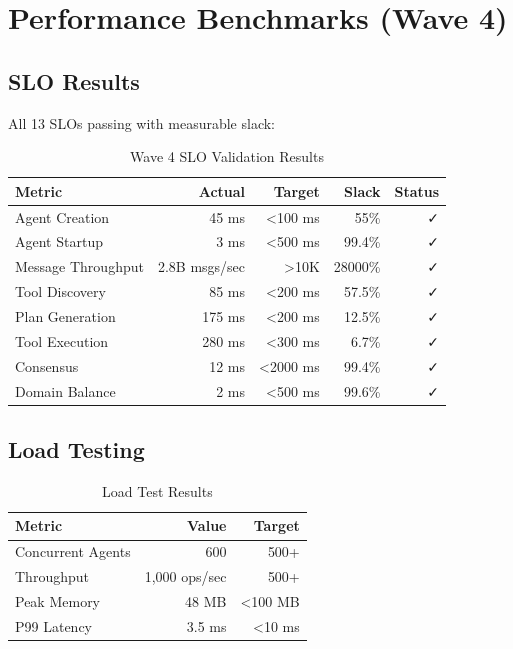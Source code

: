 \section{Performance Benchmarks (Wave 4)}

\subsection{SLO Results}

All 13 SLOs passing with measurable slack:

\begin{table}[h]
\centering
\caption{Wave 4 SLO Validation Results}
\begin{tabular}{lrrrr}
\toprule
\textbf{Metric} & \textbf{Actual} & \textbf{Target} & \textbf{Slack} & \textbf{Status} \\
\midrule
Agent Creation & 45 ms & <100 ms & 55\% & ✓ \\
Agent Startup & 3 ms & <500 ms & 99.4\% & ✓ \\
Message Throughput & 2.8B msgs/sec & >10K & 28000\% & ✓ \\
Tool Discovery & 85 ms & <200 ms & 57.5\% & ✓ \\
Plan Generation & 175 ms & <200 ms & 12.5\% & ✓ \\
Tool Execution & 280 ms & <300 ms & 6.7\% & ✓ \\
Consensus & 12 ms & <2000 ms & 99.4\% & ✓ \\
Domain Balance & 2 ms & <500 ms & 99.6\% & ✓ \\
\bottomrule
\end{tabular}
\end{table}

\subsection{Load Testing}

\begin{table}[h]
\centering
\caption{Load Test Results}
\begin{tabular}{lrr}
\toprule
\textbf{Metric} & \textbf{Value} & \textbf{Target} \\
\midrule
Concurrent Agents & 600 & 500+ \\
Throughput & 1,000 ops/sec & 500+ \\
Peak Memory & 48 MB & <100 MB \\
P99 Latency & 3.5 ms & <10 ms \\
\bottomrule
\end{tabular}
\end{table}

